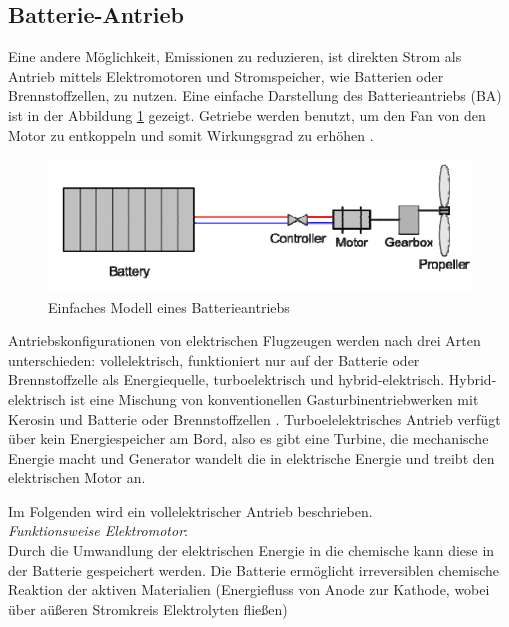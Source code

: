 \subsection{Batterie-Antrieb}
Eine andere Möglichkeit, Emissionen zu reduzieren, ist direkten Strom als Antrieb mittels Elektromotoren und Stromspeicher, wie Batterien oder Brennstoffzellen, zu nutzen.
Eine einfache Darstellung des Batterieantriebs (BA) ist in der Abbildung \ref{ba} gezeigt. Getriebe werden benutzt, um den Fan von den Motor
zu entkoppeln und somit Wirkungsgrad zu erhöhen \cite{hepperle2012electric}.
%
\begin{figure}[h]
	\centering
	\includegraphics[width=0.7\linewidth]{Bilder/BA.png}
	\caption[Einfaches Modell eines Batterieantriebs]{Einfaches Modell eines Batterieantriebs \cite{hepperle2012electric}}
	\label{ba}
\end{figure}

Antriebskonfigurationen von elektrischen Flugzeugen werden nach drei Arten unterschieden: vollelektrisch, funktioniert nur auf der Batterie oder
Brennstoffzelle als Energiequelle, turboelektrisch und hybrid-elektrisch. Hybrid-elektrisch ist eine Mischung von konventionellen 
Gasturbinentriebwerken mit Kerosin und Batterie oder Brennstoffzellen \cite{dahal2021techno}. Turboelelektrisches Antrieb verfügt über
kein Energiespeicher am Bord, also es gibt eine Turbine, 
die mechanische Energie macht und Generator wandelt die in elektrische Energie und treibt den elektrischen Motor an. %

Im Folgenden wird ein vollelektrischer Antrieb beschrieben.\\
%
\textit{Funktionsweise Elektromotor}: \\
Durch die Umwandlung der elektrischen Energie in die chemische kann diese in der Batterie gespeichert werden.
Die Batterie ermöglicht irreversiblen chemische Reaktion der aktiven Materialien (Energiefluss von Anode zur Kathode, wobei über aüßeren Stromkreis Elektrolyten fließen)

